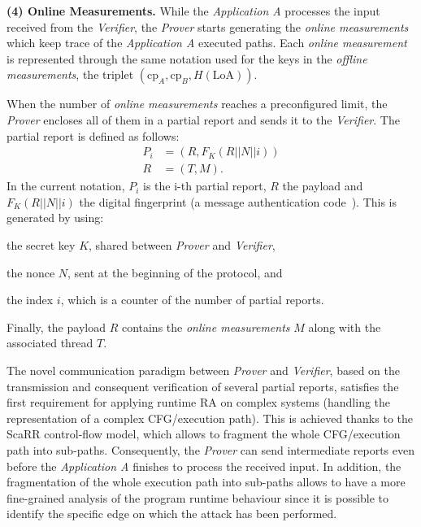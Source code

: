 \textbf{(4) Online Measurements.}
While the \emph{Application A} processes the input received from the 
\emph{Verifier}, the \emph{Prover} starts generating the \emph{online 
measurements} which keep trace of the \emph{Application A} executed paths. Each 
\emph{online measurement} is represented through the same notation used for the 
keys in the \emph{offline measurements}, \ie the triplet  
$(\text{cp}_A,\text{cp}_B,H(\text{LoA}))$.

When the number of \emph{online measurements} reaches a preconfigured limit, 
the \emph{Prover} encloses all of them in a partial report and sends it to the 
\emph{Verifier}. The partial report is defined as follows: 
\begin{equation*}
\begin{split}
P_i &= (R,F_K(R||N||i))\\
R &= (T, M).
\end{split}
\end{equation*}
In the current notation, $P_i$ is the i-th partial report, $R$ the payload and 
$F_K(R||N||i)$ the digital fingerprint (\eg a message authentication 
code~\cite{bellare2000security}).
This is generated by using:
\begin{enumerate*}[label=(\roman*)]
	\item the secret key $K$, shared between \emph{Prover} and \emph{Verifier},
	\item the nonce $N$, sent at the beginning of the protocol, and
	\item the index $i$, which is a counter of the number of partial reports.
\end{enumerate*}
Finally, the payload $R$ contains the \emph{online measurements} $M$ along with 
the associated thread $T$.

The novel communication paradigm between \emph{Prover} and \emph{Verifier}, 
based on the transmission and consequent verification of several partial 
reports, satisfies the first requirement for applying runtime RA on complex 
systems (\ie handling the representation of a complex CFG/execution path). This 
is achieved thanks to the ScaRR control-flow model, which allows to fragment 
the whole CFG/execution path into sub-paths. Consequently, the \emph{Prover} 
can send intermediate reports even before the \emph{Application A} finishes to 
process the received input. In addition, the fragmentation of the whole 
execution path into sub-paths allows to have a more fine-grained analysis of 
the program runtime behaviour since it is possible to identify the specific 
edge on which the attack has been performed. 

